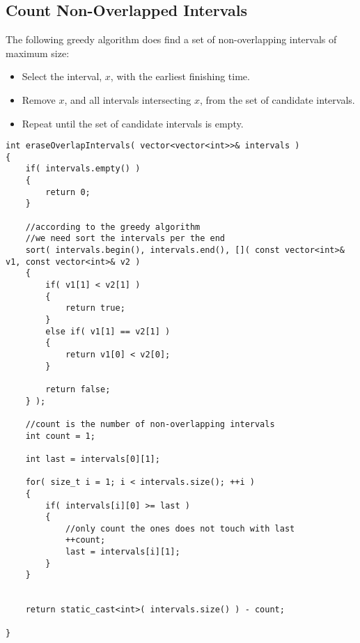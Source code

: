 \subsection{Count Non-Overlapped Intervals}
The following greedy algorithm does find a set of non-overlapping intervals of maximum size:

\begin{itemize}
\item Select the interval, $x$, with the earliest finishing time.
\item Remove $x$, and all intervals intersecting $ x $, from the set of candidate intervals.
\item Repeat until the set of candidate intervals is empty.
\end{itemize}


\setcounter{lstlisting}{0}
\begin{lstlisting}[style=customc, caption={Count Maximum Non-overlapping Intervals}]
int eraseOverlapIntervals( vector<vector<int>>& intervals )
{
    if( intervals.empty() )
    {
        return 0;
    }

    //according to the greedy algorithm
    //we need sort the intervals per the end
    sort( intervals.begin(), intervals.end(), []( const vector<int>& v1, const vector<int>& v2 )
    {
        if( v1[1] < v2[1] )
        {
            return true;
        }
        else if( v1[1] == v2[1] )
        {
            return v1[0] < v2[0];
        }

        return false;
    } );

    //count is the number of non-overlapping intervals
    int count = 1;

    int last = intervals[0][1];

    for( size_t i = 1; i < intervals.size(); ++i )
    {
        if( intervals[i][0] >= last )
        {
            //only count the ones does not touch with last
            ++count;
            last = intervals[i][1];
        }
    }


    return static_cast<int>( intervals.size() ) - count;

}
\end{lstlisting}